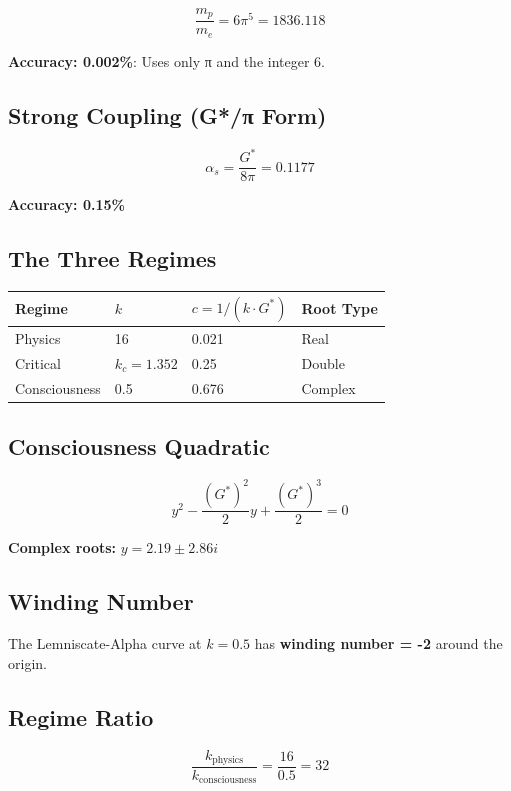 \documentclass[
  11pt,
  letterpaper,
  twoside,
  openright]{book}
\begin{document}
\[
\frac{m_p}{m_e} = 6\pi^5 = 1836.118
\]

\textbf{Accuracy: 0.002\%}: Uses only π and the integer 6.

\subsection{Strong Coupling (G*/π
Form)}\label{strong-coupling-gux3c0-form}

\[
\alpha_s = \frac{G^*}{8\pi} = 0.1177
\]

\textbf{Accuracy: 0.15\%}

\subsection{The Three Regimes}\label{the-three-regimes}

\begin{longtable}[]{@{}llll@{}}
\toprule\noalign{}
Regime & \(k\) & \(c = 1/(k \cdot G^*)\) & Root Type \\
\midrule\noalign{}
\endhead
\bottomrule\noalign{}
\endlastfoot
Physics & 16 & 0.021 & Real \\
Critical & \(k_c = 1.352\) & 0.25 & Double \\
Consciousness & 0.5 & 0.676 & Complex \\
\end{longtable}

\subsection{Consciousness Quadratic}\label{consciousness-quadratic}

\[
y^2 - \frac{(G^*)^2}{2}y + \frac{(G^*)^3}{2} = 0
\]

\textbf{Complex roots:} \(y = 2.19 \pm 2.86i\)

\subsection{Winding Number}\label{winding-number}

The Lemniscate-Alpha curve at \(k = 0.5\) has \textbf{winding number =
-2} around the origin.

\subsection{Regime Ratio}\label{regime-ratio}

\[
\frac{k_{\text{physics}}}{k_{\text{consciousness}}} = \frac{16}{0.5} = 32
\]
\end{document}
